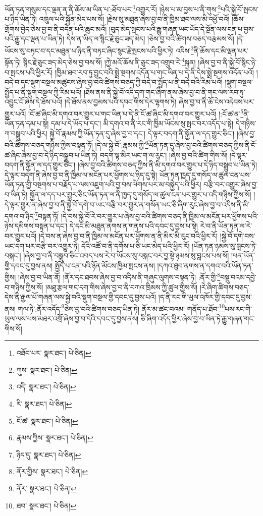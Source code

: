 ཡོན་ཏན་གསུམ་དང་ལྡན་ན་ནི་ཆོས་མ་ཡིན་པ་:ཐོབ་པར་\footnote{འཐོབ་པར་  སྣར་ཐང་།  པེ་ཅིན། }འགྱུར་རོ། །ཉེས་པ་མ་བྱས་པ་ནི་གུས་\footnote{ཀུས་  སྣར་ཐང་།  པེ་ཅིན། }པའི་སྐྱེ་བོ་སྤངས་པ་ཉིད་ཡིན་ཏེ། འཁྲུལ་པའི་སྐྱོན་མེད་པས་སོ། །རྗེས་སུ་མཐུན་ཞེས་བྱ་བ་ནི་ཁྱིམ་ཐབ་ལས་མི་འཕྱོ་བའོ། །ཆོས་གྲོགས་བྱེད་ཅེས་བྱ་བ་ནི་བདེན་པའི་ཆུང་མའོ། །བུད་མེད་སྤངས་པའི་རྒྱུ་གཞན་ཡང་ཡོད་དེ་སྔོན་ལས་ངན་པ་བྱས་པའི་རྒྱུ་དང་ལྡན་པ་ཡིན་ཏེ། དེས་ན་ཡིད་ལ་སྙིང་རྗེ་ཅུང་ཟད་མེད། །ཅེས་བྱ་བའི་ཚིགས་བཅད་བརྩམས་སོ། །དེ་ཡོངས་སུ་བཏང་བ་དང་མཐུན་པ་ཉིད་ནི་བཏང་ཞིང་སྙང་རྗེ་སྤངས་པའི་ཕྱིར་ཏེ། འདིས་\footnote{འདི་  སྣར་ཐང་།  པེ་ཅིན། }ནི་ཆོས་དང་མི་ལྡན་པར་སྟོན་ཏེ། སྙིང་རྗེ་ཅུང་ཟད་མེད་ཅེས་བྱ་བས་སོ། །ཀྱེ་མའོ་ཆོས་ནི་ཅུང་ཟད་འགྲུབ་རེ་\footnote{རི་  སྣར་ཐང་།  པེ་ཅིན། }སྐན། །ཞེས་བྱ་བ་ནི་སྐྱེ་བོ་སྙིང་ཉེ་བ་སྤངས་པའི་ཕྱིར་རོ། །ཁྱིམ་ཐབ་རབ་ཏུ་བྱུང་བའི་སྨྲེ་སྔགས་འདོན་པ་གང་ཡིན་པ་དེ་ནི་དེས་སྨྲེ་སྔགས་འདོན་པའོ། །བདེ་བ་དང་སྡུག་བསྔལ་མཚུངས་ཞེས་བྱ་བའི་ཚིགས་བཅད་ཀྱི་བདེ་བ་སྤྱོད་པ་ནི་བདེ་བའི་རིམ་པའོ། །སྡུག་བསྔལ་སྤྱོད་པ་ནི་སྡུག་བསྔལ་ཀྱི་རིམ་པའོ། །ཐོས་ནས་ནི་སྐྱེ་བོ་འདི་དག་གང་ཞིག་ནས་ཞེས་བྱ་བ་ནི་གང་ལས་རབ་ཏུ་འབྱུང་ངོ་ཞེས་དེ་ཐོས་པའོ། །དེ་ཐོས་ནས་བྱམས་པའི་དབང་གིས་དེར་ལྷགས་ཏེ། ཞེས་བྱ་བ་ནི་ཆོ་ངེས་འདེབས་པར་གྱུར་པའོ། །ངོ་ཚ་ཞིང་མི་དགའ་བར་གྱུར་པ་གང་ཡིན་པ་དེ་ནི་ངོ་ཚ་ཞིང་མི་དགའ་བར་གྱུར་པའོ། །:ངོ་ཚ་ན་\footnote{ངོ་ཚ་  སྣར་ཐང་།  པེ་ཅིན། }ནི་ཡོན་ཏན་དམ་པ་སྟེ། དམ་པ་དེ་ཡོད་པ་དང་། མི་དགའ་བ་ནི་རང་གི་ཁྱིམ་ཡོངས་སུ་སྤང་བར་འདོད་པ་སྟེ། དེ་གཉིས་ཀ་བསྒྲུབ་པའི་ཕྱིར། སྐྱེ་བོ་རྣམས་ཀྱི་ཡོན་ཏན་དུ་ཞེས་བྱ་བ་དང་། དེ་ལྟར་བདག་ནི་སྐྱོན་ལ་དད་གྱུར་ཅིང་། །ཞེས་བྱ་བའི་ཚིགས་བཅད་གཉིས་ཀྱིས་བསྟན་ཏོ། །དེ་ལ་སྐྱེ་བོ་:རྣམས་ཀྱི་\footnote{རྣམས་ཀྱིས་  སྣར་ཐང་།  པེ་ཅིན། }ཡོན་ཏན་དུ་ཞེས་བྱ་བའི་ཚིགས་བཅད་ཀྱིས་ནི་ངོ་ཚ་ཞིང་ཞེས་བྱ་བ་དེ་ཉིད་བསྒྲུབ་པ་ཡིན་ཏེ། བདག་ལྟ་མིར་ཡང་ག་ལ་རུང་། །ཞེས་བྱ་བའི་ཚིག་གིས་སོ། །དེ་ལྟར་བདག་ནི་སྐྱོན་ལ་དད་གྱུར་ཅིང་། །ཞེས་བྱ་བའི་ཚིགས་བཅད་ཀྱིས་ནི་མི་དགའ་བར་གྱུར་པ་དེ་ཉིད་བསྒྲུབ་པ་ཡིན་ཏེ། དེ་ལྟར་བདག་ནི་ཞེས་བྱ་བ་ནི་ཁྱིམ་ལ་མངོན་པར་ཕྱོགས་པ་ཉིད་དུ་སྟེ། ཡོན་ཏན་ཁྱད་དུ་གསོད་ལ་ཚུལ་ངན་པས་ཡོན་ཏན་གྱི་བསྔགས་པ་བརྗོད་པ་ལས་འཇུག་པའི་བྱ་བས་ལེགས་པར་མ་བསྐྱེད་པའི་ཕྱིར། བརྩི་བར་འགྱུར་ཞེས་བྱ་བ་ཡིན་ཏེ། སྐྱོན་ལ་དད་པར་གྱུར་ཅིང་ཡོན་ཏན་ལ་ནི་ཁྱད་དུ་གསོད་ལ་ཚུལ་ངན་པར་གྱུར་པ་འདི་གཉིས་ཀྱིས་སོ། །དེ་ལྟར་གྱུར་ན་ཞེས་བྱ་བ་ནི་སྐྱེ་བོ་དགེ་བ་ཡང་བརྩི་བར་གྱུར་ན་གསོན་ཡང་ཅི་ཞིག་རུང་ཞེས་བྱ་བ་འདིས་ནི་མི་དགའ་བ་ཉིད་\footnote{ཉིད་དུ་  སྣར་ཐང་།  པེ་ཅིན། }བསྟན་ཏོ། །དེ་བས་སྐྱེ་བོ་རེ་བར་གྱུར་པ་ཞེས་བྱ་བའི་ཚིགས་བཅད་ནི་ཁྱིམ་ལ་མངོན་པར་ཕྱོགས་པའི་ཉེས་དམིགས་བསྟན་པ་དང་། དེ་དང་མི་མཐུན་ནགས་ན་གནས་པའི་དབང་དུ་བྱས་པ་སྟེ། རེ་བ་ནི་ཡོན་ཏན་ལ་རེ་བར་གྱུར་པའོ། །དེ་བས་ན་ཞེས་བྱ་བ་ནི་ཁྱིམ་ལ་མངོན་པར་ཕྱོགས་ན་ནི་མིར་མི་རུང་བའི་ཕྱིར་རོ། །སྐྱེ་བོ་དགེ་བས་ཡང་དག་པར་བརྩི་བར་འགྱུར་ཏེ། དེའི་འཚོ་བ་ནི་དགོས་པ་ཅི་ཡང་མེད་པའི་ཕྱིར་རོ། །ཡོན་ཏན་ཉམས་སུ་བླངས་ཏེ་བསྐང་། །ཞེས་བྱ་བ་ནི་བསྒྲུབ་ཅིང་འབད་པས་རེ་བ་ཡོངས་སུ་བསྐང་བར་བྱ་སྟེ་ཉམས་སུ་བླངས་པས་སོ། །ཕན་ཡོན་གྱི་དབང་དུ་བྱས་ནས། སྤྱོད་པ་ངན་པའི་ཉོན་མོངས་ཁྱིམ་སྤངས་ནས། །དཀའ་ཐུབ་ནགས་ན་དགའ་བའི་ཡོན་ཏན་གྱིས། །ཞེས་བྱ་བ་ཡིན་ནོ། །ནོར་དང་ཐབས་ཞེས་བྱ་བ་འདིས་ནི་གཞུང་ལུགས་བསྟན་ཏེ། :ནོར་གྱི་\footnote{ནོར་གྱིས་  སྣར་ཐང་།  པེ་ཅིན། }བསྡུ་བའམ་དབྱེ་བ་གཉིས་ཀྱིས་སོ། །མཐུ་རྩལ་གང་དག་གིས་ཞེས་བྱ་བ་ནི་བཀའ་ཁྲིམས་ཀྱི་ཚུལ་གྱིས་སོ། །རེ་ཞིག་ཚིགས་བཅད་དེས་ནི་རྒྱལ་པོ་གཞན་ལས་སྐྱེ་བའི་སྡུག་བསྔལ་གྱི་དབང་དུ་བྱས་པའོ། །ད་ནི་རང་གི་ཡུལ་འཁོར་གྱི་དབང་དུ་བྱས་ནས། གལ་ཏེ་:ནོར་འདོད་\footnote{ནོར་  སྣར་ཐང་།  པེ་ཅིན། }ཅེས་བྱ་བའི་ཚིགས་བཅད་ཡིན་ཏེ། ནོར་མ་ཚང་བའམ། གནོད་པ་ཐོབ་\footnote{ཐབ་  སྣར་ཐང་།  པེ་ཅིན། }པས་རང་གི་ཡུལ་ལས་པས་མཐར་འགྲོ་ཞེས་བྱ་བ་དེའི་དབང་དུ་བྱས་ནས། ཅི་ཞིག་འདོད་ཕྱིར་ཞེས་བྱ་བ་ཡིན་ཏེ་རྒྱུ་གཞན་གང་གིས་སོ། 